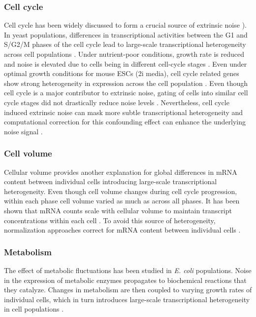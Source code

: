 \subsubsection{Cell cycle}

Cell cycle has been widely discussed to form a crucial source of extrinsic noise \citep{Colman-Lerner2005a, Newman2006}). In yeast populations, differences in transcriptional activities between the G1 and S/G2/M phases of the cell cycle lead to large-scale transcriptional heterogeneity across cell populations \citep{Zopf2013}. Under nutrient-poor conditions, growth rate is reduced and noise is elevated due to cells being in different cell-cycle stages \citep{Keren2015}.  Even under optimal growth conditions for mouse ESCs (2i media), cell cycle related genes show strong heterogeneity in expression across the cell population \citep{Kolodziejczyk2015a}. Even though cell cycle is a major contributor to extrinsic noise, gating of cells into similar cell cycle stages did not drastically reduce noise levels \citep{Raser2004}. Nevertheless, cell cycle induced extrinsic noise can mask more subtle transcriptional heterogeneity and computational correction for this confounding effect can enhance the underlying noise signal \citep{Buettner2015}. 

\subsubsection{Cell volume}

Cellular volume provides another explanation for global differences in mRNA content between individual cells introducing large-scale transcriptional heterogeneity. Even though cell volume changes during cell cycle progression, within each phase cell volume varied as much as across all phases. It has been shown that mRNA counts scale with cellular volume to maintain transcript concentrations within each cell \citep{Kempe2015, Padovan-Merhar2015, Zhurinsky2010}. To avoid this source of heterogeneity, normalization approaches correct for mRNA content between individual cells \citep{Vallejos2017}.

\subsubsection{Metabolism}

The effect of metabolic fluctuations has been studied in \textit{E. coli} populations. Noise in the expression of metabolic enzymes propagates to biochemical reactions that they catalyze. Changes in metabolism are then coupled to varying growth rates of individual cells, which in turn introduces large-scale transcriptional heterogeneity in cell populations \citep{Kiviet2014}.  

